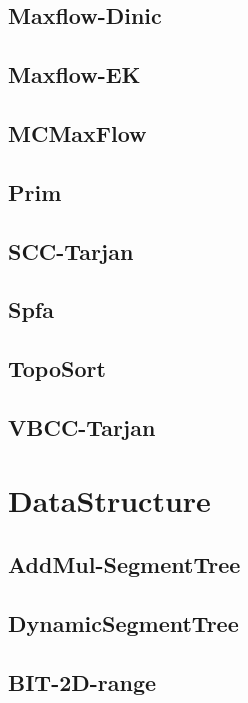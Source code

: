 \documentclass{article}
\begin{document}
\subsection{Maxflow-Dinic}

\subsection{Maxflow-EK}

\subsection{MCMaxFlow}

\subsection{Prim}

\subsection{SCC-Tarjan}

\subsection{Spfa}

\subsection{TopoSort}

\subsection{VBCC-Tarjan}

\section{DataStructure}
\subsection{AddMul-SegmentTree}

\subsection{DynamicSegmentTree}

\subsection{BIT-2D-range}

\end{document}
